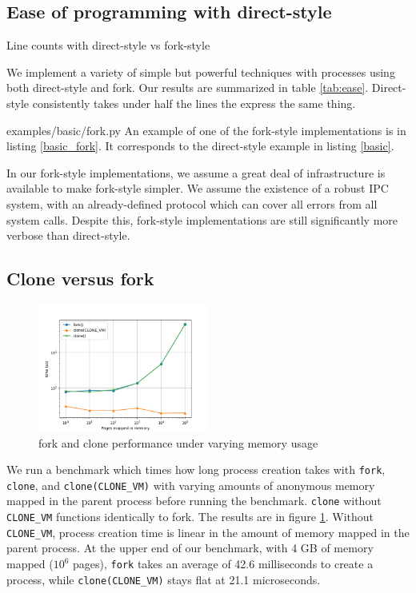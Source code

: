 \documentclass[sigplan]{acmart}
\begin{document}
\subsection{Ease of programming with direct-style}\label{ease}
\begin{table}

\caption{Line counts with direct-style vs fork-style}
\label{tab:ease}
\end{table}
We implement a variety of simple but powerful techniques with processes
using both direct-style and fork.
Our results are summarized in table \ref{tab:ease}.
Direct-style consistently takes under half the lines the express the same thing.

{examples/basic/fork.py}
An example of one of the fork-style implementations is in listing \ref{basic_fork}.
It corresponds to the direct-style example in listing \ref{basic}.

In our fork-style implementations,
we assume a great deal of infrastructure is available to make fork-style simpler.
We assume the existence of a robust IPC system,
with an already-defined protocol which can cover all errors from all system calls.
Despite this, fork-style implementations are still significantly more verbose than direct-style.
\subsection{Clone versus fork}\label{microbench}
\begin{figure}[h!]
\centering
 \includegraphics[width=0.5\textwidth]{microbench}
 \caption{fork and clone performance under varying memory usage}
 \label{fig:microbench}
\end{figure}

We run a benchmark which times how long process creation takes
with \texttt{fork}, \texttt{clone}, and \verb|clone(CLONE_VM)|
with varying amounts of anonymous memory mapped in the parent process
before running the benchmark.
\texttt{clone} without \verb|CLONE_VM| functions identically to fork.
The results are in figure \ref{fig:microbench}.
Without \verb|CLONE_VM|,
process creation time is linear in the amount of memory mapped in the parent process.
At the upper end of our benchmark, with 4 GB of memory mapped ($10^6$ pages),
\texttt{fork} takes an average of 42.6 milliseconds to create a process,
while \verb|clone(CLONE_VM)| stays flat at 21.1 microseconds.
\end{document}
